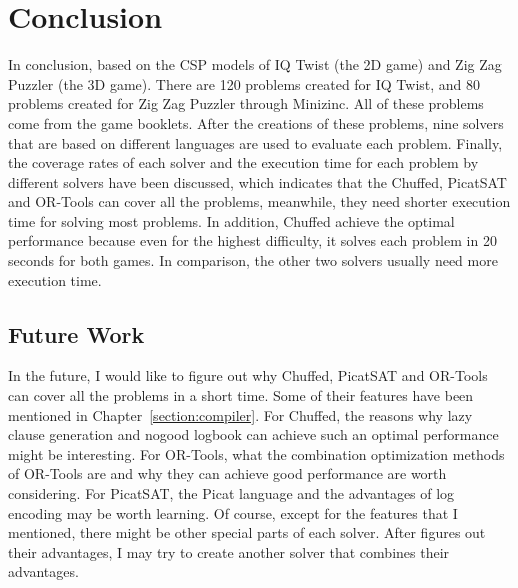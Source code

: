 \chapter{Conclusion}
\label{cha:conc}
In conclusion, based on the CSP models of IQ Twist (the 2D game) and Zig Zag Puzzler (the 3D game). There are 120 problems created for IQ Twist, and 80 problems created for Zig Zag Puzzler through Minizinc. All of these problems come from the game booklets. After the creations of these problems, nine solvers that are based on different languages are used to evaluate each problem. Finally, the coverage rates of each solver and the execution time for each problem by different solvers have been discussed, which indicates that the Chuffed, PicatSAT and OR-Tools can cover all the problems, meanwhile, they need shorter execution time for solving most problems. In addition, Chuffed achieve the optimal performance because even for the highest difficulty, it solves each problem in 20 seconds for both games. In comparison, the other two solvers usually need more execution time.
\section{Future Work}
\label{sec:future}
In the future, I would like to figure out why Chuffed, PicatSAT and OR-Tools can cover all the problems in a short time. Some of their features have been mentioned in Chapter~\ref{section:compiler}. 
For Chuffed, the reasons why lazy clause generation and nogood logbook can achieve such an optimal performance might be interesting. 
For OR-Tools, what the combination optimization methods of OR-Tools are and why they can achieve good performance are worth considering.
For PicatSAT, the Picat language and the advantages of log encoding may be worth learning.
Of course, except for the features that I mentioned, there might be other special parts of each solver. After figures out their advantages, I may try to create another solver that combines their advantages.




